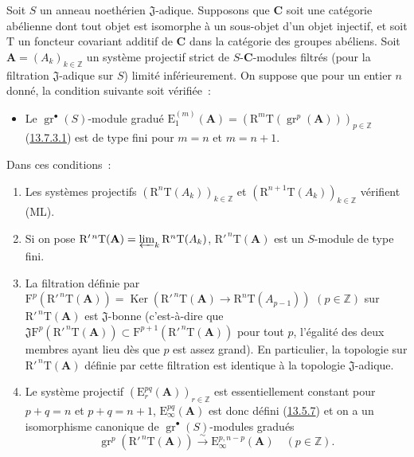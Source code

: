\begin{proposition}[13.7.7]
\label{0.13.7.7-fr}
Soit $S$ un anneau noethérien $\mathfrak J$-adique. Supposons que $\boldsymbol{C}$ soit
une catégorie abélienne dont tout objet est isomorphe à un sous-objet d'un
objet injectif, et soit $\mathrm T$ un foncteur covariant additif de $\boldsymbol{C}$ dans
la catégorie des groupes abéliens. Soit
$\mathbf A=(A_k)_{k\in\mathbb Z}$ un
système projectif strict de $S$-$\boldsymbol{C}$-modules filtrés (pour la filtration
$\mathfrak J$-adique sur $S$) limité inférieurement. On suppose que pour un
entier $n$ donné, la condition suivante soit vérifiée~:
\begin{itemize}
\item[$(\mathrm F_n)$] Le $\operatorname{gr}^\bullet(S)$-module gradué
$\mathrm E_1^{(m)}(\mathbf A)=
(\mathrm R^m\mathrm T(\operatorname{gr}^p(\mathbf A)))_{p\in\mathbb Z}$
\textup{(\hyperref[0.13.7.3.1-fr]{13.7.3.1})} est de type fini pour $m=n$ et
$m=n+1$.
\end{itemize}
Dans ces conditions~:
\begin{enumerate}
\item[\rm(i)] Les systèmes projectifs
$(\mathrm R^n\mathrm T(A_k))_{k\in\mathbb Z}$ et
$(\mathrm R^{n+1}\mathrm T(A_k))_{k\in\mathbb Z}$ vérifient \textup{(ML)}.
\item[\rm(ii)] Si on pose
$\mathrm R'^{\,n}\mathrm T(\mathbf A)=
\varprojlim_k\mathrm R^n\mathrm T(A_k)$,
$\mathrm R'^{\,n}\mathrm T(\mathbf A)$ est un $S$-module de type fini.
\item[\rm(iii)] La filtration définie par
$\mathrm F^p(\mathrm R'^{\,n}\mathrm T(\mathbf A))=
\operatorname{Ker}(\mathrm R'^{\,n}\mathrm T(\mathbf A)
\to\mathrm R^n\mathrm T(A_{p-1}))$ $(p\in\mathbb Z)$
sur $\mathrm R'^{\,n}\mathrm T(\mathbf A)$ est $\mathfrak J$-bonne
(c'est-à-dire que
$\mathfrak J\mathrm F^p(\mathrm R'^{\,n}\mathrm T(\mathbf A))
\subset\mathrm F^{p+1}(\mathrm R'^{\,n}\mathrm T(\mathbf A))$ pour tout
$p$, l'égalité des deux membres ayant lieu dès que $p$ est assez grand). En
particulier, la topologie sur $\mathrm R'^{\,n}\mathrm T(\mathbf A)$ définie
par cette filtration est identique à la topologie $\mathfrak J$-adique.
\item[\rm(iv)] Le système projectif
$(\mathrm E_r^{pq}(\mathbf A))_{r\in\mathbb Z}$ est essentiellement constant
pour $p+q=n$ et $p+q=n+1$, $\mathrm E_\infty^{pq}(\mathbf A)$ est donc défini
\textup{(\hyperref[0.13.5.7-fr]{13.5.7})} et on a un isomorphisme canonique de
$\operatorname{gr}^\bullet(S)$-modules gradués
\begin{equation}
\label{0.13.7.7.1-fr}
\tag{13.7.7.1}
\operatorname{gr}^p(\mathrm R'^{\,n}\mathrm T(\mathbf A))
\xrightarrow{\sim}\mathrm E_\infty^{p,n-p}(\mathbf A)
\quad(p\in\mathbb Z).
\end{equation}
\end{enumerate}
\end{proposition}

